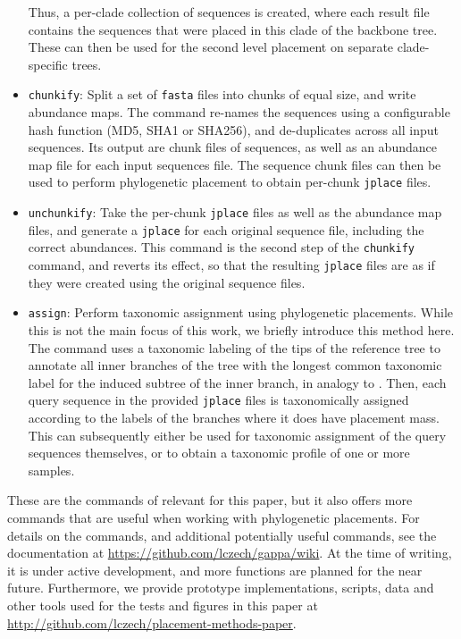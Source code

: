 \begin{itemize}
          Thus, a per-clade collection of sequences is created, where each result file contains the sequences
          that were placed in this clade of the backbone tree.
          These can then be used for the second level placement on separate clade-specific trees.
    \item \texttt{chunkify}: Split a set of \texttt{fasta} files into chunks of equal size,
          and write abundance maps.
          The command re-names the sequences using a configurable hash function (MD5, SHA1 or SHA256),
          and de-duplicates across all input sequences.
          Its output are chunk files of sequences, as well as an abundance map file for each input sequences file.
          The sequence chunk files can then be used to perform phylogenetic placement
          to obtain per-chunk \texttt{jplace} files.
    \item \texttt{unchunkify}: Take the per-chunk \texttt{jplace} files as well as the abundance map files,
          and generate a \texttt{jplace} for each original sequence file, including the correct abundances.
          This command is the second step of the \texttt{chunkify} command, and reverts its effect,
          so that the resulting \texttt{jplace} files are as if they were created using the original sequence files.
    \item \texttt{assign}: Perform taxonomic assignment using phylogenetic placements.
          While this is not the main focus of this work, we briefly introduce this method here.
          The command uses a taxonomic labeling of the tips of the reference tree
          to annotate all inner branches of the tree with the longest common taxonomic label
          for the induced subtree of the inner branch, in analogy to  \citep{Kozlov2016}.
          Then, each query sequence in the provided \texttt{jplace} files
          is taxonomically assigned according to the labels of the branches where it does have placement mass.
          This can subsequently either be used for taxonomic assignment of the query sequences themselves,
          or to obtain a taxonomic profile of one or more samples.
\end{itemize}

These are the commands of  relevant for this paper,
but it also offers more commands that are useful when working with phylogenetic placements.
For details on the commands, and additional potentially useful commands,
see the  documentation at \url{https://github.com/lczech/gappa/wiki}.
At the time of writing, it is under active development, and more functions are planned for the near future.
Furthermore, we provide prototype implementations, scripts, data and other tools
used for the tests and figures in this paper at \url{http://github.com/lczech/placement-methods-paper}.

